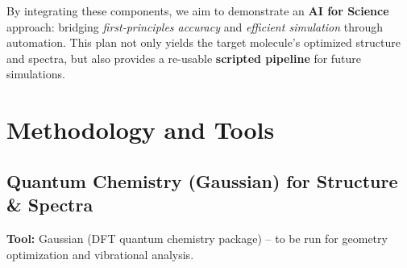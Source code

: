 \documentclass[11pt]{article}
\begin{document}
By integrating these components, we aim to demonstrate an \textbf{AI for Science} approach: bridging \emph{first-principles accuracy} and \emph{efficient simulation} through automation. This plan not only yields the target molecule’s optimized structure and spectra, but also provides a re-usable \textbf{scripted pipeline} for future simulations.

\section{Methodology and Tools}

\subsection{Quantum Chemistry (Gaussian) for Structure \& Spectra}
\textbf{Tool:} Gaussian (DFT quantum chemistry package) -- to be run for geometry optimization and vibrational analysis.
\end{document}
